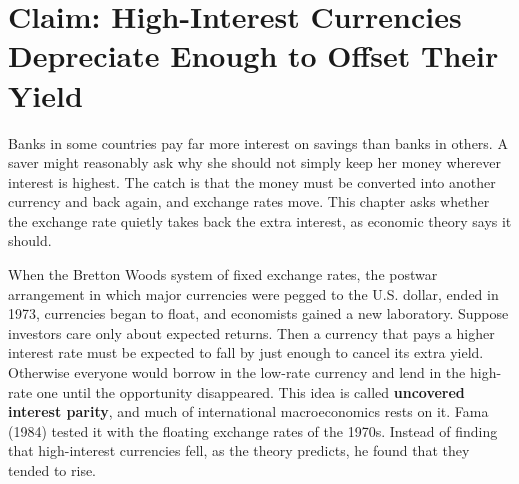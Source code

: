 \makeatletter
{}
\makeatother

\makeatletter
\makeatother

\chapter{Claim: High-Interest Currencies Depreciate Enough to Offset Their Yield}
\label{ch:11}

Banks in some countries pay far more interest on savings than banks in others. A saver might reasonably ask why she should not simply keep her money wherever interest is highest. The catch is that the money must be converted into another currency and back again, and exchange rates move. This chapter asks whether the exchange rate quietly takes back the extra interest, as economic theory says it should.

When the Bretton Woods system of fixed exchange rates, the postwar arrangement in which major currencies were pegged to the U.S. dollar, ended in 1973, currencies began to float, and economists gained a new laboratory. Suppose investors care only about expected returns. Then a currency that pays a higher interest rate must be expected to fall by just enough to cancel its extra yield. Otherwise everyone would borrow in the low-rate currency and lend in the high-rate one until the opportunity disappeared. This idea is called \textbf{uncovered interest parity}, and much of international macroeconomics rests on it. Fama (1984) tested it with the floating exchange rates of the 1970s. Instead of finding that high-interest currencies fell, as the theory predicts, he found that they tended to rise.

